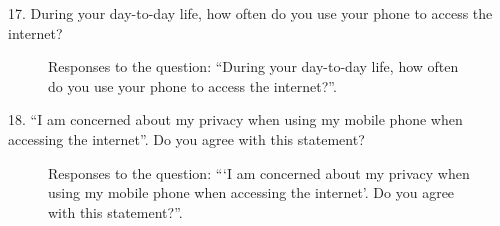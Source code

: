 17. During your day-to-day life, how often do you use your phone to access the internet?

\begin{figure}[H]
    \begin{center}
        \caption*{Responses to the question: ``During your day-to-day life, how often do you use your phone to access the internet?''.}
        \label{fig:survey_s1_q17}
    \end{center}
\end{figure}

18. ``I am concerned about my privacy when using my mobile phone when accessing the internet''. Do you agree with this statement?

\begin{figure}[H]
    \begin{center}
        \caption*{Responses to the question: ```I am concerned about my privacy when using my mobile phone when accessing the internet'. Do you agree with this statement?''.}
        \label{fig:survey_s1_q18}
    \end{center}
\end{figure}

